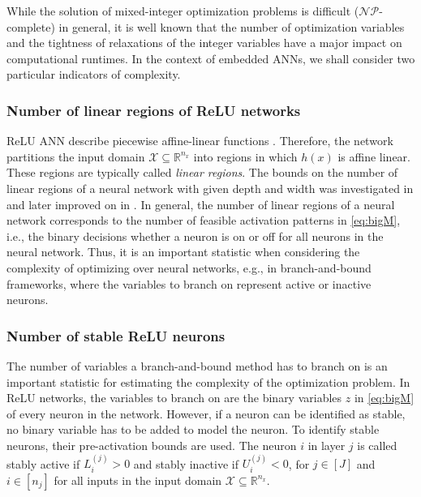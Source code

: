 While the solution of mixed-integer optimization problems is difficult ($\mathcal{NP}$-complete) in general, it is well known that the number of optimization variables and the tightness of relaxations of the integer variables have a major impact on computational runtimes. In the context of embedded ANNs, we shall consider two particular indicators of complexity.

\subsubsection{Number of linear regions of ReLU networks}

ReLU ANN describe piecewise affine-linear functions \citep{Grigsby2022}. Therefore, the network partitions the input domain $\mathcal{X} \subseteq \mathbb{R}^{n_x}$ into regions in which $h(x)$ is affine linear. These regions are typically called \textit{linear regions}. The bounds on the number of linear regions of a neural network with given depth and width was investigated in \citet{Montufar2014} and later improved on in \citet{Raghu2017}. In general, the number of linear regions of a neural network corresponds to the number of feasible activation patterns in \eqref{eq:bigM}, i.e., the binary decisions whether a neuron is on or off for all neurons in the neural network. Thus, it is an important statistic when considering the complexity of optimizing over neural networks, e.g., in branch-and-bound frameworks, where the variables to branch on represent active or inactive neurons. 

\subsubsection{Number of stable ReLU neurons}

The number of variables a branch-and-bound method has to branch on is an important statistic for estimating the complexity of the optimization problem. In ReLU networks, the variables to branch on are the binary variables $z$ in \eqref{eq:bigM} of every neuron in the network. However, if a neuron can be identified as stable, no binary variable has to be added to model the neuron. To identify stable neurons, their pre-activation bounds are used. The neuron $i$ in layer $j$ is called stably active if $L^{(j)}_i > 0$ and stably inactive if $U^{(j)}_i < 0$, for $j \in [J]$ and $i \in [n_j]$ for all inputs in the input domain $\mathcal{X} \subseteq \mathbb{R}^{n_x}$. 

